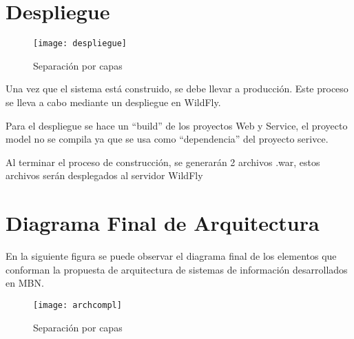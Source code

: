 \section{Despliegue}

\begin{figure}[H]
  \begin{center}
    \texttt{[image: despliegue]}
  \end{center}
  \caption{Separación por capas}
\end{figure}

Una vez que el sistema está construido, se debe llevar a producción. Este proceso se lleva a cabo mediante un despliegue en WildFly.

Para el despliegue se hace un “build” de los proyectos Web y Service, el proyecto model no se compila ya que se usa como “dependencia” del proyecto serivce.

Al terminar el proceso de construcción, se generarán 2 archivos .war, estos archivos serán desplegados al servidor WildFly
\newpage
\section{Diagrama Final de Arquitectura} 

En la siguiente figura se puede observar el diagrama final de los elementos que conforman la propuesta de arquitectura de sistemas de información desarrollados en MBN.

\begin{figure}[H]
  \begin{center}
    \texttt{[image: archcompl]}
  \end{center}
  \caption{Separación por capas}
\end{figure}

